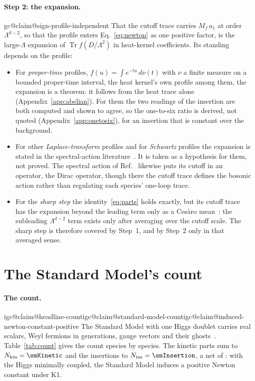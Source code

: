\documentclass[aps,prd,reprint,amsmath,amssymb,superscriptaddress,nofootinbib]{revtex4-2}
\makeatletter
\newcommand{\Nkin}{N_{\mathrm{kin}}}
\newcommand{\Nins}{N_{\mathrm{ins}}}
\newcommand{\claim}[1]{\expandafter\xdef\csname igc@claim@#1\endcsname{\thesection}}
\makeatother
\begin{document}
\paragraph{Step 2: the expansion.}
\claim{sign-profile-independent}%
That the cutoff trace carries $M_f\,a_1$ at order $\Lambda^{d-2}$, so that the profile
enters Eq.~\eqref{eq:newton} as one positive factor, is the large-$\Lambda$ expansion of
$\operatorname{Tr}f(D/\Lambda^2)$ in heat-kernel coefficients. Its standing depends on
the profile:
\begin{itemize}
\item For \emph{proper-time} profiles, $f(u)=\int e^{-tu}\,d\nu(t)$ with $\nu$ a finite
measure on a bounded proper-time interval, the heat kernel's own profile among them,
the expansion is a theorem: it follows from the heat trace alone
(Appendix~\ref{app:abelian}). For them the two readings of the insertion are both
computed and shown to agree, so the one-to-six ratio is derived, not quoted
(Appendix~\ref{app:onetosix}), for an insertion that is constant over the background.
\item For other \emph{Laplace-transform} profiles and for \emph{Schwartz} profiles the
expansion is stated in the spectral-action
literature~\cite{vanSuijlekom2024,EcksteinIochum2018,EstradaGraciaBondiaVarilly1998}.
It is taken as a hypothesis for them, not proved. The spectral action of
Ref.~\cite{ChamseddineConnes1997} likewise puts its cutoff in an operator, the Dirac
operator, though there the cutoff trace defines the bosonic action rather than
regulating each species' one-loop trace.
\item For the \emph{sharp step} the identity~\eqref{eq:parts} holds exactly, but its
cutoff trace has the expansion beyond the leading term only as a Ces\`aro
mean~\cite{EstradaGraciaBondiaVarilly1998}: the subleading $\Lambda^{d-2}$ term exists
only after averaging over the cutoff scale. The sharp step is therefore covered by
Step~1, and by Step~2 only in that averaged sense.
\end{itemize}

\section{The Standard Model's count}
\label{sec:count}

\paragraph{The count.}
\claim{headline-count}\claim{standard-model-count}\claim{induced-newton-constant-positive}%
The Standard Model with one Higgs doublet carries \smScalars{} real scalars,
\smWeyl{} Weyl fermions in \smGenerations{} generations, \gaugeVectors{} gauge
vectors and their \smGhosts{} ghosts~\cite{PDG2024}. Table~\ref{tab:count} gives the
count species by species. The kinetic parts sum to $\Nkin=\smKinetic$ and the
insertions to $\Nins=\smInsertion$, a net of \smNet{}: with the Higgs minimally
coupled, the Standard Model induces a positive Newton constant under K1.
\end{document}
